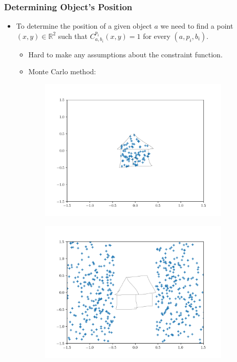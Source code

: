 \documentclass{beamer}
\begin{document}
\begin{frame}
    \frametitle{Determining Object's Position}
    \begin{itemize}
        \item To determine the position of a given object $a$ we need to find a point $(x, y) \in \mathbb{R}^2$ such
        that $C_{a,b_i}^{p_i}(x, y) = 1$ for every $(a, p_i, b_i)$.
        \begin{itemize}
            \item Hard to make any assumptions about the constraint function.
            \item Monte Carlo method:
        \end{itemize}
    \end{itemize}
    \begin{figure}[ht]
        \centering
        \begin{subfigure}{0.45\textwidth}
            \centering
            \includegraphics[width=\textwidth]{figures/rule_in_house.pdf}
        \end{subfigure}
        \begin{subfigure}{0.45\textwidth}
            \centering
            \includegraphics[width=\textwidth]{figures/rule_disjunct_side_house.png}
        \end{subfigure}
    \end{figure}
\end{frame}
\end{document}
